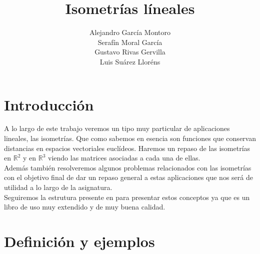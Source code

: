 \documentclass[10pt,a4paper]{article}
\author{Alejandro García Montoro \\ Serafín Moral García \\ Gustavo Rivas Gervilla \\ Luis Suárez Lloréns}
\title{Isometrías líneales}
\date{}
\begin{document}
\maketitle
\tableofcontents

\section{Introducción}

A lo largo de este trabajo veremos un tipo muy particular de aplicaciones lineales, las isometrías. Que como sabemos en esencia son funciones que conservan distancias en espacios vectoriales euclídeos. Haremos un repaso de las isometrías en $\mathbb{R}^2$ y en $\mathbb{R}^3$ viendo las matrices asociadas a cada una de ellas.\\

Además también resolveremos algunos problemas relacionados con las isometrías con el objetivo final de dar un repaso general a estas aplicaciones que nos será de utilidad a lo largo de la asignatura.\\

Seguiremos la estrutura presente en \cite{merino} para presentar estos conceptos ya que es un libro de uso muy extendido y de muy buena calidad.

\section{Definición y ejemplos}



\newpage
\nocite{*}


\end{document}
